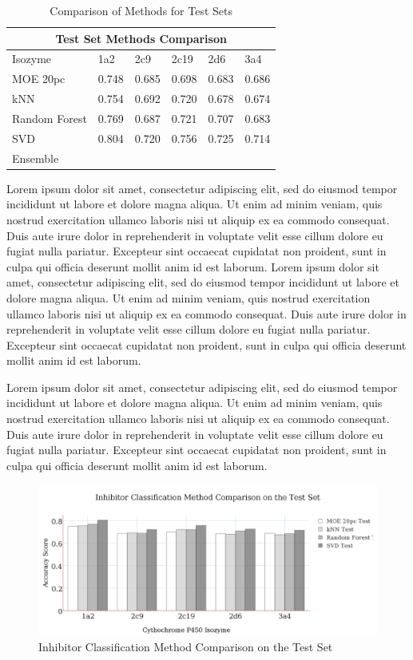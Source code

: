 \begin{table}[!h]
\begin{tabular}{|l|l|l|l|l|l|}
\hline
\multicolumn{6}{|c|}{Test Set Methods Comparison}     \\ \hline
Isozyme       & 1a2   & 2c9   & 2c19  & 2d6   & 3a4   \\ \hline
MOE 20pc      & 0.748 & 0.685 & 0.698 & 0.683 & 0.686 \\ \hline
kNN           & 0.754 & 0.692 & 0.720 & 0.678 & 0.674 \\ \hline
Random Forest & 0.769 & 0.687 & 0.721 & 0.707 & 0.683 \\ \hline
SVD           & 0.804 & 0.720 & 0.756 & 0.725 & 0.714 \\ \hline
Ensemble      &       &       &       &       &       \\ \hline
\end{tabular}
\caption{Comparison of Methods for Test Sets}
\end{table}

Lorem ipsum dolor sit amet, consectetur adipiscing elit, sed do eiusmod tempor incididunt ut labore et dolore magna aliqua. Ut enim ad minim veniam, quis nostrud exercitation ullamco laboris nisi ut aliquip ex ea commodo consequat. Duis aute irure dolor in reprehenderit in voluptate velit esse cillum dolore eu fugiat nulla pariatur. Excepteur sint occaecat cupidatat non proident, sunt in culpa qui officia deserunt mollit anim id est laborum. Lorem ipsum dolor sit amet, consectetur adipiscing elit, sed do eiusmod tempor incididunt ut labore et dolore magna aliqua. Ut enim ad minim veniam, quis nostrud exercitation ullamco laboris nisi ut aliquip ex ea commodo consequat. Duis aute irure dolor in reprehenderit in voluptate velit esse cillum dolore eu fugiat nulla pariatur. Excepteur sint occaecat cupidatat non proident, sunt in culpa qui officia deserunt mollit anim id est laborum.
 
Lorem ipsum dolor sit amet, consectetur adipiscing elit, sed do eiusmod tempor incididunt ut labore et dolore magna aliqua. Ut enim ad minim veniam, quis nostrud exercitation ullamco laboris nisi ut aliquip ex ea commodo consequat. Duis aute irure dolor in reprehenderit in voluptate velit esse cillum dolore eu fugiat nulla pariatur. Excepteur sint occaecat cupidatat non proident, sunt in culpa qui officia deserunt mollit anim id est laborum.


\begin{figure}[!h]
\includegraphics[width=1\textwidth]{../img/method_comparison_test_set.png}
\caption{Inhibitor Classification Method Comparison on the Test Set}
\end{figure}

